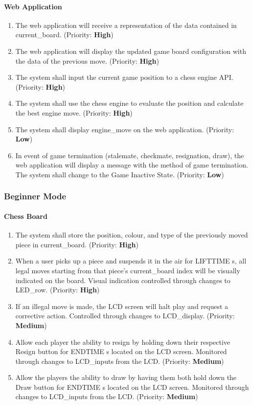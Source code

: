 \documentclass[12pt]{article}
\begin{document}
\paragraph{Web Application}
\begin{enumerate}[{EA}1., leftmargin=2\parindent]
    \item The web application will receive a representation of the data contained in current\_board. (Priority: \textbf{High}) 
    \item The web application will display the updated game board configuration with the data of the previous move. (Priority: \textbf{High}) 
    \item The system shall input the current game position to a chess engine API. (Priority: \textbf{High}) 
    \item The system shall use the chess engine to evaluate the position and calculate the best engine move. (Priority: \textbf{High}) 
    \item The system shall display engine\_move on the web application. (Priority: \textbf{Low}) 
    \item In event of game termination (stalemate, checkmate, resignation, draw), the web application will display a message with the method of game termination. The system shall change to the Game Inactive State. (Priority: \textbf{Low}) 
\end{enumerate}

\subsubsection{Beginner Mode}
\paragraph{Chess Board}
\begin{enumerate}[{BB}1., leftmargin=2\parindent]
    \item The system shall store the position, colour, and type of the previously moved piece in current\_board. (Priority: \textbf{High}) 
    \item When a user picks up a piece and suspends it in the air for LIFTTIME \si{\second}, all legal moves starting from that piece's current\_board index will be visually indicated on the board. Visual indication controlled through changes to LED\_row. (Priority: \textbf{High}) 
    \item If an illegal move is made, the LCD screen will halt play and request a corrective action. Controlled through changes to LCD\_display. (Priority: \textbf{Medium}) 
    \item Allow each player the ability to resign by holding down their respective Resign button for ENDTIME \si{\second} located on the LCD screen. Monitored through changes to LCD\_inputs from the LCD. (Priority: \textbf{Medium}) 
    \item Allow the players the ability to draw by having them both hold down the Draw button for ENDTIME \si{\second} located on the LCD screen. Monitored through changes to LCD\_inputs from the LCD. (Priority: \textbf{Medium}) 
\end{enumerate}
\end{document}

